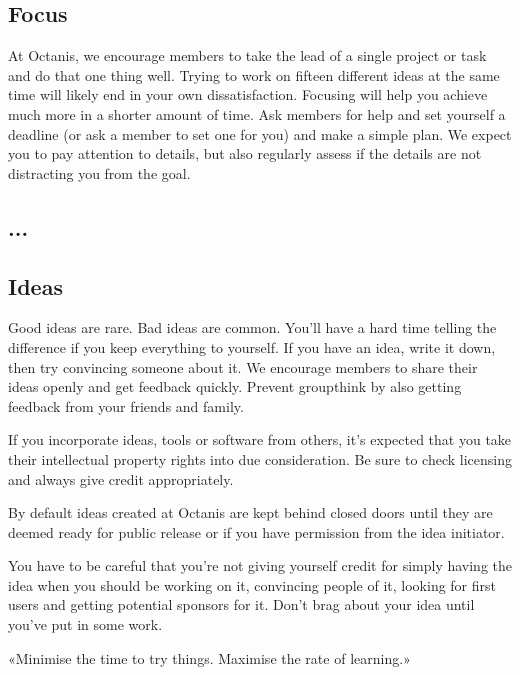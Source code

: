 	
\english
	\subsection{Focus}
	At Octanis, we encourage members to take the lead of a single project or task and do that one thing well. Trying to work on fifteen different ideas at the same time will likely end in your own dissatisfaction. Focusing will help you achieve much more in a shorter amount of time. Ask members for help and set yourself a deadline (or ask a member to set one for you) and make a simple plan.
	We expect you to pay attention to details, but also regularly assess if the details are not distracting you from the goal.




\french
	\subsection{...}

	

\english
	\subsection{Ideas}
	Good ideas are rare. Bad ideas are common. You'll have a hard time telling the difference if you keep everything to yourself.
	If you have an idea, write it down, then try convincing someone about it. We encourage members to share their ideas openly and get feedback quickly. Prevent groupthink by also getting feedback from your friends and family.

	If you incorporate ideas, tools or software from others, it's expected that you take their intellectual property rights into due consideration. Be sure to check licensing and always give credit appropriately.

	By default ideas created at Octanis are kept behind closed doors until they are deemed ready for public release or if you have permission from the idea initiator.

	You have to be careful that you're not giving yourself credit for simply having the idea when you should be working on it, convincing people of it, looking for first users and getting potential sponsors for it. Don't brag about your idea until you've put in some work.

	«Minimise the time to try things. Maximise the rate of learning.»





